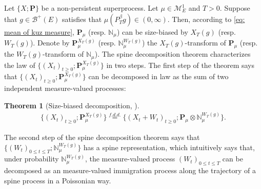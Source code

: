 \documentclass[12pt,a4paper]{amsart}
\newtheorem{thm}{Theorem}[section]
\theoremstyle{definition}
\numberwithin{equation}{section}
\begin{document}
Let $\{X;\mathbf P\}$ be a non-persistent superprocess.
Let $\mu \in \mathcal M^1_E$ and $T>0$.
Suppose that $g\in \mathscr B^+(E)$ satisfies that $\mu(P^\beta_Tg) \in (0,\infty)$.
Then, according to \eqref{eq: mean of kuz measure}, $\mathbf P_\mu$ (resp. $\mathbb N_\mu$) can be size-biased by $X_T(g)$ (resp. $W_T(g)$).
Denote by $\mathbf P_\mu^{X_T(g)}$ (resp. $\mathbb N^{W_T(g)}_\mu$) the $X_T(g)$-transform of $\mathbf P_\mu$ (resp. the $W_T(g)$-transform of $\mathbb N_\mu$).
The spine decomposition theorem characterizes the law of $\{(X_t)_{t\geq 0}; \mathbf P_\mu^{X_T(g)}\}$ in two steps.
The first step of the theorem says that $\{(X_t)_{t\geq 0}; \mathbf P_\mu^{X_T(g)}\}$ can be decomposed in law as the sum of two independent measure-valued processes:
	
\begin{thm}[Size-biased decomposition,  \cite{RenSongSun2017Spine}]\label{thm: size-biased decomposition}
  \begin{align}
    \{(X_t)_{t\geq 0}; \mathbf P_\mu^{X_T(g)}\}
    \overset{f.d.d.}{=} \{(X_t+W_t)_{t\geq 0}; \mathbf P_\mu  \otimes \mathbb N^{W_T(g)}_\mu\}.
  \end{align}
\end{thm}
The second step of the spine decomposition theorem says that $\{(W_t)_{0\leq t\leq T}; \mathbb N^{W_T(g)}_\mu\}$ has a spine representation, which intuitively says that, under probability $\mathbb N_\mu^{W_T(g)}$, 
the measure-valued process $(W_t)_{0\leq t\leq T}$ can be decomposed as an measure-valued immigration process along the trajectory of a spine process in a Poissonian way.
\end{document}
